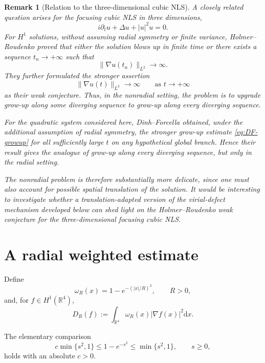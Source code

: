 \documentclass[10pt,a4paper]{amsart}
\numberwithin{equation}{section}
\newtheorem{remark}[theorem]{Remark}
\newcommand{\R}{\mathbb{R}}
\newcommand{\dd}{\mathrm{d}x}
\begin{document}
\begin{remark}[Relation to the three-dimensional cubic NLS]
A closely related question arises for the focusing cubic NLS in three dimensions,
\[
 i\partial_t u+\Delta u+|u|^2u=0.
\]
For $H^1$ solutions, without assuming radial symmetry or finite variance, Holmer--Roudenko \cite{HR} proved that either the solution blows up in finite time or there exists a sequence $t_n\to+\infty$ such that
\[
 \|\nabla u(t_n)\|_{L^2}\longrightarrow\infty.
\]
They further formulated the stronger assertion
\[
 \|\nabla u(t)\|_{L^2}\longrightarrow\infty \qquad\text{as }t\to+\infty
\]
as their \emph{weak conjecture}. Thus, in the nonradial setting, the problem is to upgrade grow-up along some diverging sequence to grow-up along every diverging sequence.

For the quadratic system considered here, Dinh--Forcella \cite{DF} obtained, under the additional assumption of radial symmetry, the stronger grow-up estimate \eqref{eq:DF-growup} for all sufficiently large $t$ on any hypothetical global branch. Hence their result gives the analogue of grow-up along every diverging sequence, but only in the radial setting.

The nonradial problem is therefore substantially more delicate, since one must also account for possible spatial translation of the solution. It would be interesting to investigate whether a translation-adapted version of the virial-defect mechanism developed below can shed light on the Holmer--Roudenko weak conjecture for the three-dimensional focusing cubic NLS.
\end{remark}



\section{A radial weighted estimate}\label{sec:weighted}
\setcounter{equation}{0}
Define
\begin{equation*}
\omega_R(x)=1-e^{-(|x|/R)^2}, \qquad R>0,
\end{equation*}
and, for $f\in H^1(\R^4)$,
\begin{equation*}
 D_R(f):=\int_{\R^4}\omega_R(x)|\nabla f(x)|^2\dd.
\end{equation*}

The elementary comparison
\begin{equation}\label{eq:omega-basic}
 c\min\{s^2,1\}\le 1-e^{-s^2}\le \min\{s^2,1\},
 \qquad s\ge0,
\end{equation}
holds with an absolute $c>0$.
\end{document}
